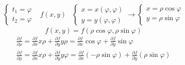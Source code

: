 \begin{teorema}
\begin{equation*}
\begin{matrix}
\begin{cases}
					t_1=\varphi\\
					t_2=\varphi
				\end{cases} & f(x,y) &
				\begin{cases}
					x=x(\varphi,\varphi)\\
					y=y(\varphi,\varphi)
				\end{cases}\to \begin{cases}
					x=\rho\cos \varphi\\
					y=\rho \sin \varphi
				\end{cases}
			\end{matrix}
		\end{equation*}
		\begin{equation*}
			f(x,y)=f(\rho\cos\varphi,\rho \sin \varphi)
		\end{equation*}
		\begin{equation*}
			\begin{matrix}
				\frac{\partial f}{\partial \rho}=\frac{\partial f}{\partial x}
				x\rho+\frac{\partial f}{\partial y}y\rho=
				\frac{\partial f}{\partial x} \cos \varphi+
				\frac{\partial f}{\partial y} \sin \varphi\\
				\frac{\partial f}{\partial \rho}=\frac{\partial f}{\partial x}
				x\rho+\frac{\partial f}{\partial y}y\varphi=
				\frac{\partial f}{\partial x} (-\rho\sin \varphi)+
				\frac{\partial f}{\partial y} (\rho\sin \varphi)
			\end{matrix}
		\end{equation*}
\end{teorema}
